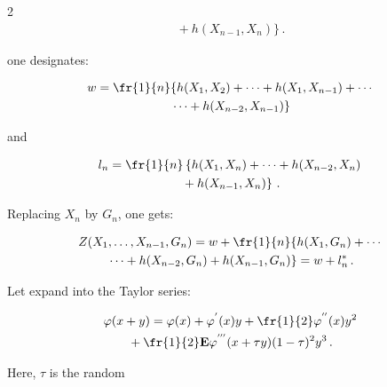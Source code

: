 \begin{multicols}{2}
\begin{multline*}
{}+h(X_{n-1},X_n)\}\,.

\end{multline*}

    one designates:

    

    \noindent

    \begin{multline*}

    w=\fr{1}{n}\{h(X_1,X_2)+\cdots+h(X_1,X_{n-1})+

    \cdots{}\\

    {}\cdots +h(X_{n-2},X_{n-1})\}

    \end{multline*}

    and

    \begin{multline*}

    l_n=\fr{1}{n}\left\{h(X_1,X_n)+\cdots+h(X_{n-2},X_n)\right.\\

\left.    {}+h(X_{n-1},X_n)\right\}\,.

    \end{multline*}

    Replacing $X_n$ by $G_n$, one gets:

    

    \noindent

    \begin{multline*}

    Z(X_1,\ldots,X_{n-1},G_n)=w+\fr{1}{n}\{h(X_1,G_n)+\cdots{}\\

{}    \cdots+h(X_{n-2},G_n)+

    h(X_{n-1},G_n)\}

    {}= w+l_n^{*}\,.

    \end{multline*}

    Let expand into the Taylor series:

    \begin{multline*}

    \varphi(x+y)=\varphi(x)+\varphi^{'}(x)y+\fr{1}{2}\varphi^{''}(x)y^{2}\\

    {}+\fr{1}{2}

    \mathbf{E}\varphi^{'''}(x+\tau y)(1-\tau)^{2}y^3\,. 

    \end{multline*}

    Here, $\tau$ is the random


\end{multicols}
